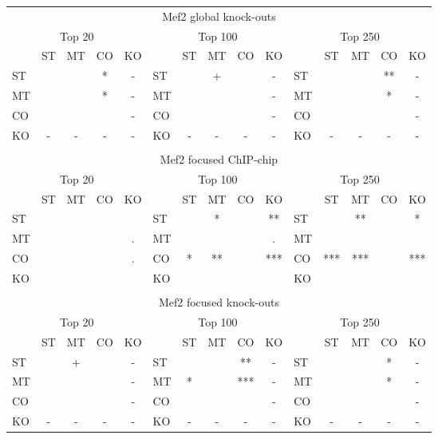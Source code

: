 \documentclass{article}
\begin{document}
\begin{longtable}[c]{lcccc|lcccc|lcccc}
\multicolumn{15}{c}{Mef2 global knock-outs} \\
\multicolumn{5}{c|}{Top 20} &\multicolumn{5}{c|}{Top 100}  & \multicolumn{5}{c}{Top 250}\\
    & ST  & MT  & CO  & KO &     & ST  & MT  & CO  & KO  &     & ST  & MT  & CO  & KO \\
ST &     &     & *   & -   & ST &     & +   &     & -   & ST &     &     & **  & -  \\
MT &     &     & *   & -   & MT &     &     &     & -   & MT &     &     & *   & -  \\
CO &     &     &     & -   & CO &     &     &     & -   & CO &     &     &     & -  \\
KO & -   & -   & -   & -   & KO & -   & -   & -   & -   & KO & -   & -   & -   & -  \\
\hline
\\[0mm]
\multicolumn{15}{c}{Mef2 focused ChIP-chip} \\
\multicolumn{5}{c|}{Top 20} &\multicolumn{5}{c|}{Top 100}  & \multicolumn{5}{c}{Top 250}\\
    & ST  & MT  & CO  & KO &     & ST  & MT  & CO  & KO  &     & ST  & MT  & CO  & KO \\
ST &     &     &     &     & ST &     & *   &     & **  & ST &     & **  &     & *  \\
MT &     &     &     & .   & MT &     &     &     & .   & MT &     &     &     &    \\
CO &     &     &     & .   & CO & *   & **  &     & *** & CO & *** & *** &     & ***\\
KO &     &     &     &     & KO &     &     &     &     & KO &     &     &     &    \\[3mm]
\hline
\\[0mm]
\multicolumn{15}{c}{Mef2 focused knock-outs} \\
\multicolumn{5}{c|}{Top 20} &\multicolumn{5}{c|}{Top 100}  & \multicolumn{5}{c}{Top 250}\\
    & ST  & MT  & CO  & KO &     & ST  & MT  & CO  & KO  &     & ST  & MT  & CO  & KO \\
ST &     & +   &     & -   & ST &     &     & **  & -   & ST &     &     & *   & -  \\
MT &     &     &     & -   & MT & *   &     & *** & -   & MT &     &     & *   & -  \\
CO &     &     &     & -   & CO &     &     &     & -   & CO &     &     &     & -  \\
KO & -   & -   & -   & -   & KO & -   & -   & -   & -   & KO & -   & -   & -   & -  \\
\end{longtable}
\end{document}
